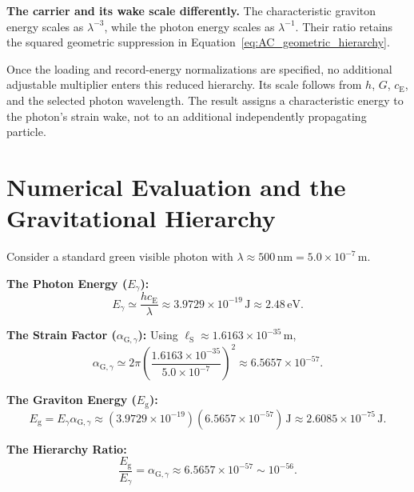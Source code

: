 \noindent\textbf{The carrier and its wake scale differently.}
The characteristic graviton energy scales as $\lambda^{-3}$, while the photon energy scales as $\lambda^{-1}$. Their ratio retains the squared geometric suppression in Equation~\eqref{eq:AC_geometric_hierarchy}.

Once the loading and record-energy normalizations are specified, no additional adjustable multiplier enters this reduced hierarchy. Its scale follows from $h$, $G$, $c_{\mathrm E}$, and the selected photon wavelength. The result assigns a characteristic energy to the photon's strain wake, not to an additional independently propagating particle.

\section{Numerical Evaluation and the Gravitational Hierarchy}
\label{sec:AC_numerical_hierarchy}

Consider a standard green visible photon with $\lambda\approx500\,\mathrm{nm}=5.0\times10^{-7}\,\mathrm m$.

\noindent\textbf{The Photon Energy ($E_\gamma$):}
\begin{equation}
    E_\gamma
    \simeq\frac{hc_{\mathrm E}}{\lambda}
    \approx3.9729\times10^{-19}\,\mathrm J
    \approx2.48\,\mathrm{eV}.
    \label{eq:AC_visible_photon_energy}
\end{equation}

\noindent\textbf{The Strain Factor ($\alpha_{\mathrm G,\gamma}$):}
Using $\ell_{\mathrm S}\approx1.6163\times10^{-35}\,\mathrm m$,
\begin{equation}
    \alpha_{\mathrm G,\gamma}
    \simeq2\pi\left(
    \frac{1.6163\times10^{-35}}{5.0\times10^{-7}}
    \right)^{2}
    \approx6.5657\times10^{-57}.
    \label{eq:AC_visible_photon_loading}
\end{equation}

\noindent\textbf{The Graviton Energy ($E_{\mathrm g}$):}
\begin{equation}
    E_{\mathrm g}
    =E_\gamma\alpha_{\mathrm G,\gamma}
    \approx(3.9729\times10^{-19})(6.5657\times10^{-57})\,\mathrm J
    \approx2.6085\times10^{-75}\,\mathrm J.
    \label{eq:AC_visible_graviton_energy}
\end{equation}

\noindent\textbf{The Hierarchy Ratio:}
\begin{equation}
    \frac{E_{\mathrm g}}{E_\gamma}
    =\alpha_{\mathrm G,\gamma}
    \approx6.5657\times10^{-57}
    \sim10^{-56}.
    \label{eq:AC_visible_hierarchy_ratio}
\end{equation}

